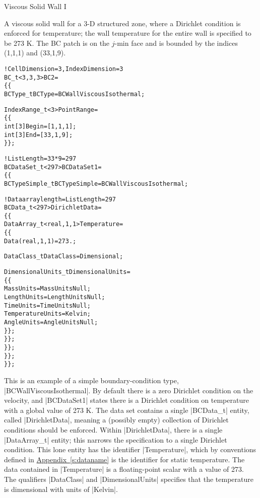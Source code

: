 \begin{example}{Viscous Solid Wall I}
\label{ex:bc2}

A viscous solid wall for a 3-D structured zone, where a Dirichlet
condition is enforced for temperature; the wall temperature for the
entire wall is specified to be 273 K.
The BC patch is on the $j$-min face and is bounded by the indices
(1,1,1) and (33,1,9).
\begin{alltt}
  !  CellDimension = 3, IndexDimension = 3
  BC\_t<3,3,3> BC2 =
    \{\{
    BCType\_t BCType = BCWallViscousIsothermal ;

    IndexRange\_t<3> PointRange =
      \{\{
      int[3] Begin = [1 ,1,1] ;
      int[3] End   = [33,1,9] ;
      \}\} ;

    !  ListLength = 33*9 = 297
    BCDataSet\_t<297> BCDataSet1 =
      \{\{
      BCTypeSimple\_t BCTypeSimple = BCWallViscousIsothermal ;

      !  Data array length = ListLength = 297
      BCData\_t<297> DirichletData =
        \{\{
        DataArray\_t<real, 1, 1> Temperature =
          \{\{
          Data(real, 1, 1) = 273. ;
          
          DataClass\_t DataClass = Dimensional ;

          DimensionalUnits\_t DimensionalUnits = 
            \{\{
            MassUnits        = MassUnitsNull ;
            LengthUnits      = LengthUnitsNull ;
            TimeUnits        = TimeUnitsNull ;
            TemperatureUnits = Kelvin ;
            AngleUnits       = AngleUnitsNull ;
            \}\} ;
          \}\} ;
        \}\} ;
      \}\} ;
    \}\} ;
\end{alltt}

This is an example of a simple boundary-condition type,
|BCWallViscousIsothermal|.
By default there is a zero Dirichlet condition on the velocity, and
|BCDataSet1| states there is a Dirichlet condition on temperature with a
global value of 273 K.
The data set contains a single |BCData_t| entity, called
|DirichletData|, meaning a (possibly empty) collection of Dirichlet
conditions should be enforced.
Within |DirichletData|, there is a single |DataArray_t| entity; this
narrows the specification to a single Dirichlet condition.
This lone entity has the identifier |Temperature|, which by conventions
defined in \hyperref[s:dataname]{Appendix~\ref*{s:dataname}} is the
identifier for static temperature.
The data contained in |Temperature| is a floating-point scalar with a
value of 273.
The qualifiers |DataClass| and |DimensionalUnits| specifies that the
temperature is dimensional with units of |Kelvin|.


\end{example}
